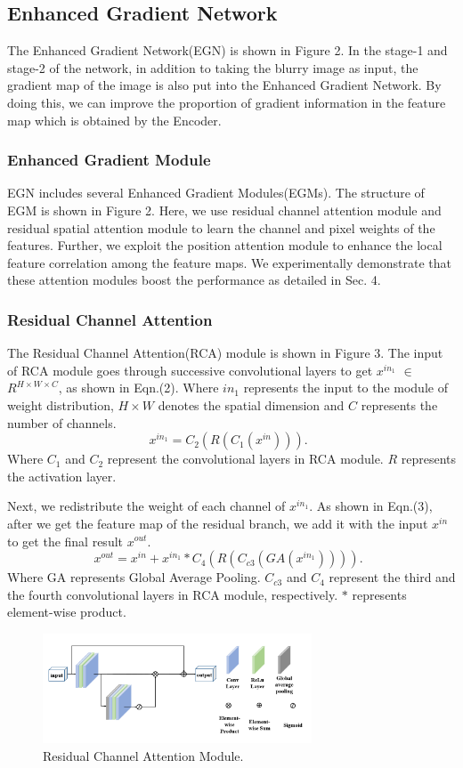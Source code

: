 \begin{sloppypar}
\subsection{Enhanced Gradient Network}
The Enhanced Gradient Network(EGN) is shown in Figure 2. In the stage-1 and stage-2 of the network, in addition to taking the blurry image as input, the gradient map of the image is also put into the Enhanced Gradient Network. By doing this, we can improve the proportion of gradient information in the feature map which is obtained by the Encoder.

\subsubsection{Enhanced Gradient Module}
EGN includes several Enhanced Gradient Modules(EGMs). The structure of EGM is shown in Figure 2. Here, we use residual channel attention module and residual spatial attention module\cite{24} to learn the channel and pixel weights of the features. Further, we exploit the position attention module to enhance the local feature correlation among the feature maps. We experimentally demonstrate that these attention modules boost the performance as detailed in Sec. 4.

\subsubsection{Residual Channel Attention}
The Residual Channel Attention(RCA) module is shown in Figure 3. The input of RCA module goes through successive convolutional layers to get $x^{in_1}$ $\in$ $R^{H \times W \times C}$, as shown in Eqn.(2). Where $in_1$ represents the input to the module of weight distribution, ${H \times W}$ denotes the spatial dimension and $C$ represents the number of channels.
\begin{equation}
	    x^{in_1}  =  C_2(R(C_1(x^{in}))). \enspace
\end{equation}
Where $C_1$ and $C_2$ represent the convolutional layers in RCA module. $R$ represents the activation layer.

Next, we redistribute the weight of each channel of $x^{in_1}$. As shown in Eqn.(3), after we get the feature map of the residual branch, we add it with the input $x^{in}$ to get the final result $x^{out}$.
\begin{equation}
	    x^{out}  =  x^{in} + x^{in_1} * C_4(R(C_{c3}(GA(x^{in_1})))). \enspace
\end{equation}
Where GA represents Global Average Pooling. $C_{c3}$ and $C_4$ represent the third and the fourth convolutional layers in RCA module, respectively. $*$ represents element-wise product.
\begin{figure}[h]
\centering
\includegraphics[width=8cm]{images/fig4.png}
\caption{Residual Channel Attention Module.}
\label{fig_sim}
\end{figure}

\end{sloppypar}
